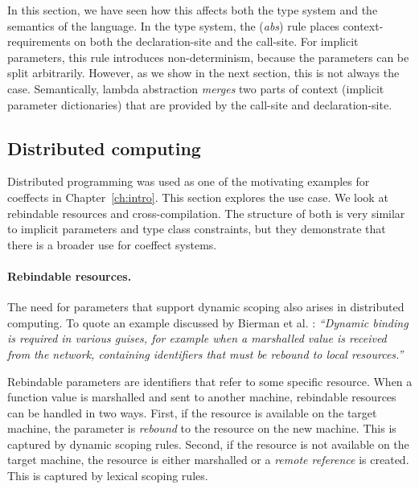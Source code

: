 In this section, we have seen how this affects both the type system and the semantics of the 
language. In the type system, the (\emph{abs}) rule places context-requirements on both the 
declaration-site and the call-site. For implicit parameters, this rule introduces non-determinism,
because the parameters can be split arbitrarily. However, as we show in the next section, this is 
not always the case. Semantically, lambda abstraction \emph{merges} two parts of context (implicit 
parameter dictionaries) that are provided by the call-site and declaration-site. 


\subsection{Distributed computing}
\label{sec:applications-flat-distr}

Distributed programming was used as one of the motivating examples for coeffects in 
Chapter~\ref{ch:intro}. This section explores the use case. We look at rebindable resources and
cross-compilation. The structure of both is very similar to implicit parameters and type
class constraints, but they demonstrate that there is a broader use for coeffect systems.


\paragraph{Rebindable resources.}

The need for parameters that support dynamic scoping also arises in distributed computing.
To quote an example discussed by Bierman et al. \cite{app-distributed-rebinding}: \emph{``Dynamic 
binding is required in various guises, for example when a marshalled value is received from the 
network, containing identifiers that must be rebound to local resources.''} 

Rebindable parameters are identifiers that refer to some specific resource. When a function value
is marshalled and sent to another machine, rebindable resources can be handled in two ways. 
First, if the resource is available on the target machine, the parameter is \emph{rebound} to
the resource on the new machine. This is captured by dynamic scoping rules. Second, if the 
resource is not available on the target machine, the resource is either marshalled or a \emph{remote 
reference} is created. This is captured by lexical scoping rules.

